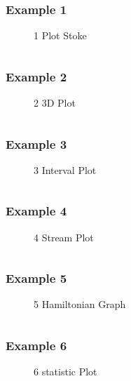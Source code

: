 \subsubsection{Example 1}
\begin{figure}[!htb]
    \centering
    
    \caption{1 Plot Stoke}
    \label{fig:1-plot-stoke}
\end{figure}
\inputminted{mathematica}{./Example/example_1.wls}
\newpage


\subsubsection{Example 2}
\begin{figure}[!htb]
    \centering
    
    \caption{2 3D Plot}
    \label{fig:2-3d-plot}
\end{figure}
\inputminted{mathematica}{./Example/example_2.wls}
\newpage


\subsubsection{Example 3}
\begin{figure}[!htb]
    \centering
    
    \caption{3 Interval Plot}
    \label{fig:3-interval-plot}
\end{figure}
\inputminted{mathematica}{./Example/example_3.wls}
\newpage


\subsubsection{Example 4}
\begin{figure}[!htb]
    \centering
    
    \caption{4 Stream Plot}
    \label{fig:4-stream-plot}
\end{figure}
\inputminted{mathematica}{./Example/example_4.wls}
\newpage

\subsubsection{Example 5}
\begin{figure}[!htb]
    \centering
    
    \caption{5 Hamiltonian Graph}
    \label{fig:5-hamiltonian-graph}
\end{figure}
\inputminted{mathematica}{./Example/example_5.wls}
\newpage


\subsubsection{Example 6}
\begin{figure}[!htb]
    \centering
    
    \caption{6 statistic Plot}
    \label{fig:6-statistic-plot}
\end{figure}
\inputminted{mathematica}{./Example/example_6.wls}
\newpage




